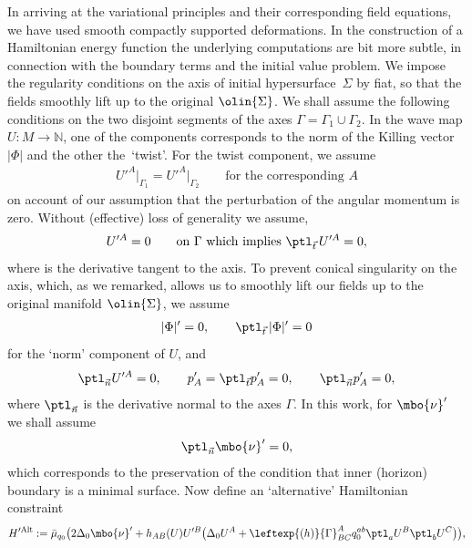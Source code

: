 In arriving at the variational principles and their corresponding field equations, we have used smooth compactly supported deformations. In the construction of a Hamiltonian energy function the underlying computations are bit more subtle, in connection with the boundary terms and the initial value problem. We impose the regularity conditions on the axis of initial hypersurface~$\Sigma$ by fiat, so that the fields smoothly lift up to the original $\olin{\Sigma}$. We shall assume the following conditions on the two disjoint segments of the axes $\Gamma = \Gamma_1 \cup \Gamma_2$. In the wave map $U \colon M \to \mathbb{N}$, one of the components corresponds to the norm of the Killing vector $\vert \Phi \vert$ and the other the~`twist'. For the twist component, we assume
\begin{align*}
U'^A\big\vert_{\Gamma_1} = U'^A \big\vert_{\Gamma_2} \qquad \text{for the corresponding $A$}
\end{align*}
on account of our assumption that the perturbation of the angular momentum is zero. Without (effective) loss of generality we assume,
\begin{align*}
U'^A = 0 \qquad \text{on} \ \Gamma \ \text{which implies} \ \ptl_{\vec{t}}\, U'^A=0,
\end{align*}
where  is the derivative tangent to the axis. To prevent conical singularity on the axis, which, as we remarked, allows us to smoothly lift our fields up to the original manifold $\olin{\Sigma}$, we assume
\begin{align*}
\vert \Phi \vert' =0, \qquad \ptl_{\vec{t}} \, \vert \Phi \vert' =0
\end{align*}
for the `norm' component of $U$, and
\begin{align*}
\ptl_{\vec{n}} U'^A =0, \qquad p'_A =\ptl_{\vec{t}} p'_A =0, \qquad \ptl_{\vec{n}} p'_A =0,
\end{align*}
where $\ptl_{\vec{n}}$ is the derivative normal to the axes $\Gamma$.
In this work, for $\mbo{\nu}'$ we shall assume
\begin{align*}
\ptl_{\vec{n}} \mbo{\nu}' =0,
\end{align*}
which corresponds to the preservation of the condition that inner (horizon) boundary is a minimal surface. Now define an `alternative' Hamiltonian constraint 
\begin{align*}
H'^{{\rm Alt}} := \bar{\mu}_{q_0} \bigl(2 \Delta_0 \mbo{\nu}' + h_{AB}(U) U'^B \bigl(\Delta_0 U^A + \leftexp{(h)}{\Gamma}^A_{BC} q^{ab}_0 \ptl_a U^B \ptl_b U^C\bigr)\bigr),
\end{align*}
